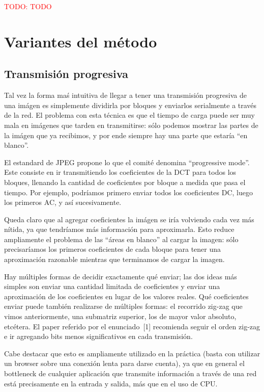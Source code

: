 \documentclass{article}
\newcommand{\TODO}[1]{\textcolor{red}{TODO: #1}}
\begin{document}
\TODO{TODO}

\section{Variantes del método}

\subsection{Transmisión progresiva}

Tal vez la forma maś intuitiva de llegar a tener una transmisión progresiva de una imágen es simplemente dividirla por bloques y enviarlos serialmente a través de la red. El problema con esta técnica es que el tiempo de carga puede ser muy mala en imágenes que tarden en transmitirse: sólo podemos mostrar las partes de la imágen que ya recibimos, y por ende siempre hay una parte que estaría ``en blanco''.

El estandard de JPEG propone lo que el comité denomina ``progressive mode''. Este consiste en ir transmitiendo los coeficientes de la DCT para todos los bloques, llenando la cantidad de coeficientes por bloque a medida que pasa el tiempo. Por ejemplo, podríamos primero enviar todos los coeficientes DC, luego los primeros AC, y así sucesivamente.

Queda claro que al agregar coeficientes la imágen se iría volviendo cada vez más nítida, ya que tendríamos más información para aproximarla. Esto reduce ampliamente el problema de las ``áreas en blanco'' al cargar la imagen: sólo precisaríamos los primeros coeficientes de cada bloque para tener una aproximación razonable mientras que terminamos de cargar la imagen.

Hay múltiples formas de decidir exactamente qué enviar; las dos ideas más simples son enviar una cantidad limitada de coeficientes y enviar una aproximación de los coeficientes en lugar de los valores reales. Qué coeficientes enviar puede también realizarse de múltiples formas: el recorrido zig-zag que vimos anteriormente, una submatriz superior, los de mayor valor absoluto, etcétera. El paper referido por el enunciado~[1] recomienda seguir el orden zig-zag e ir agregando bits menos significativos en cada transmisión.

Cabe destacar que esto es ampliamente utilizado en la práctica (basta con utilizar un browser sobre una conexión lenta para darse cuenta), ya que en general el bottleneck de cualquier aplicación que transmite información a través de una red está precisamente en la entrada y salida, más que en el uso de CPU.
\end{document}
